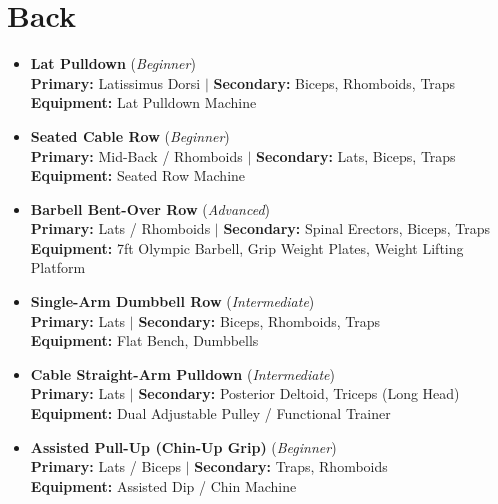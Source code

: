 \documentclass[11pt,a4paper]{article}
\begin{document}
\section*{Back}
\begin{itemize}[leftmargin=*]
  \item \textbf{Lat Pulldown} (\textit{Beginner})\\
        \textbf{Primary:} Latissimus Dorsi $|$ \textbf{Secondary:} Biceps, Rhomboids, Traps\\
        \textbf{Equipment:} Lat Pulldown Machine
  \item \textbf{Seated Cable Row} (\textit{Beginner})\\
        \textbf{Primary:} Mid-Back / Rhomboids $|$ \textbf{Secondary:} Lats, Biceps, Traps\\
        \textbf{Equipment:} Seated Row Machine
  \item \textbf{Barbell Bent-Over Row} (\textit{Advanced})\\
        \textbf{Primary:} Lats / Rhomboids $|$ \textbf{Secondary:} Spinal Erectors, Biceps, Traps\\
        \textbf{Equipment:} 7ft Olympic Barbell, Grip Weight Plates, Weight Lifting Platform
  \item \textbf{Single-Arm Dumbbell Row} (\textit{Intermediate})\\
        \textbf{Primary:} Lats $|$ \textbf{Secondary:} Biceps, Rhomboids, Traps\\
        \textbf{Equipment:} Flat Bench, Dumbbells
  \item \textbf{Cable Straight-Arm Pulldown} (\textit{Intermediate})\\
        \textbf{Primary:} Lats $|$ \textbf{Secondary:} Posterior Deltoid, Triceps (Long Head)\\
        \textbf{Equipment:} Dual Adjustable Pulley / Functional Trainer
  \item \textbf{Assisted Pull-Up (Chin-Up Grip)} (\textit{Beginner})\\
        \textbf{Primary:} Lats / Biceps $|$ \textbf{Secondary:} Traps, Rhomboids\\
        \textbf{Equipment:} Assisted Dip / Chin Machine
\end{itemize}
\vspace{0.5em}
\end{document}
